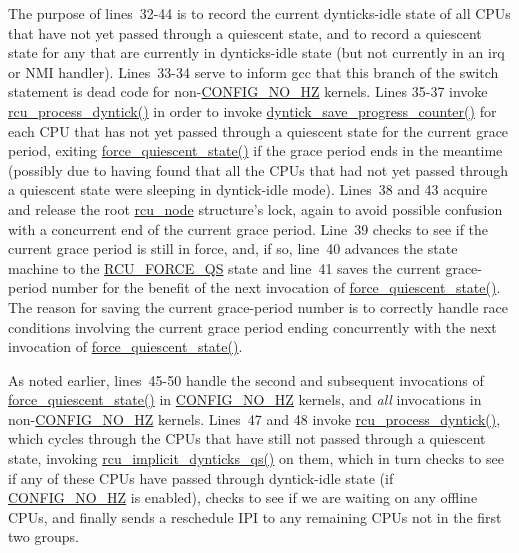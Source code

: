 The purpose of lines~32-44 is to record the current dynticks-idle state
of all CPUs that have not yet passed through a quiescent state, and
to record a quiescent state for any that are currently in dynticks-idle
state (but not currently in an irq or NMI handler).
Lines~33-34 serve to inform gcc that this branch of the switch statement
is dead code for non-\url{CONFIG_NO_HZ} kernels.
Lines 35-37 invoke \url{rcu_process_dyntick()} in order to invoke
\url{dyntick_save_progress_counter()} for each CPU that has not yet
passed through a quiescent state for the current grace period,
exiting \url{force_quiescent_state()} if the grace period ends in
the meantime (possibly due to having found that all the CPUs that
had not yet passed through a quiescent state were sleeping in
dyntick-idle mode).
Lines~38 and 43 acquire and release the root \url{rcu_node} structure's
lock, again to avoid possible confusion with a concurrent end of the
current grace period.
Line~39 checks to see if the current grace period is still in force, and,
if so, line~40 advances the state machine to the \url{RCU_FORCE_QS} state
and line~41 saves the current grace-period number for the benefit of
the next invocation of \url{force_quiescent_state()}.
The reason for saving the current grace-period number is to correctly
handle race conditions involving the current grace period ending
concurrently with the next invocation of \url{force_quiescent_state()}.

As noted earlier, lines~45-50 handle the second and subsequent invocations
of \url{force_quiescent_state()} in \url{CONFIG_NO_HZ} kernels, and \emph{all}
invocations in non-\url{CONFIG_NO_HZ} kernels.
Lines~47 and 48 invoke \url{rcu_process_dyntick()}, which cycles through
the CPUs that have still not passed through a quiescent state, invoking
\url{rcu_implicit_dynticks_qs()} on them, which in turn checks to see
if any of these CPUs have passed through dyntick-idle state (if
\url{CONFIG_NO_HZ} is enabled), checks to see if we are waiting on
any offline CPUs, and finally sends a reschedule IPI to any remaining
CPUs not in the first two groups.

